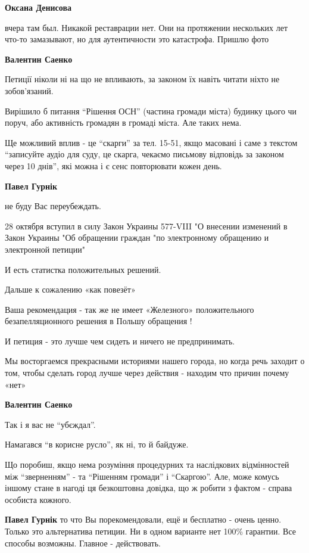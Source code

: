 \begin{itemize}
\begin{itemize}
\textbf{Оксана Денисова} 

вчера там был. Никакой реставрации нет. Они на протяжении нескольких лет что-то
замазывают, но для аутентичности это катастрофа. Пришлю фото

\textbf{Валентин Саенко} 

Петиції ніколи ні на що не впливають, за законом їх навіть читати ніхто не зобов'язаний.

Вирішило б питання \enquote{Рішення ОСН} (частина громади міста) будинку цього чи
поруч, або активність громадян в громаді міста. Але таких нема.

Ще можливий вплив - це \enquote{скарги} за тел. 15-51, якщо масовані і саме з текстом
\enquote{записуйте аудіо для суду, це скарга, чекаємо письмову відповідь за законом
через 10 днів}, які можна і є сенс повторювати кожен день.

\begin{itemize} %
\textbf{Павел Гурнік} 

не буду Вас переубеждать.

28 октября вступил в силу Закон Украины 577-VIII "О внесении изменений в Закон
Украины "Об обращении граждан "по электронному обращению и электронной петиции"

И есть статистка положительных решений.

Дальше к сожалению «как повезёт»

Ваша рекомендация - так же не имеет «Железного» положительного
безапелляционного решения в Польшу обращения !

И петиция - это лучше чем сидеть и ничего не предпринимать.

Мы восторгаемся прекрасными историями нашего города, но когда речь заходит о
том, чтобы сделать город лучше через действия - находим что причин почему «нет»

\textbf{Валентин Саенко} 

Так і я вас не \enquote{убєждал}.

Намагався \enquote{в корисне русло}, як ні, то й байдуже.

Що поробиш, якщо нема розуміння процедурних та наслідкових відмінностей між
\enquote{зверненням} - та \enquote{Рішенням громади} і \enquote{Скаргою}. Але, може комусь іншому стане
в нагоді ця безкоштовна довідка, що ж робити з фактом - справа особиста
кожного.

\textbf{Павел Гурнік} то что Вы порекомендовали, ещё и бесплатно - очень ценно.
Только это альтернатива петиции. Ни в одном варианте нет 100\% гарантии. Все способы возможны. Главное - действовать.
\end{itemize} %


\end{itemize}
\end{itemize}
